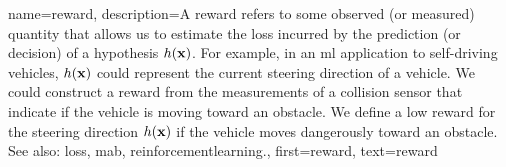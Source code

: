 {name={reward}, 
	description={A reward refers to some observed 
		(or measured) quantity that allows us to estimate the \gls{loss} incurred by the \gls{prediction} 
		(or decision) of a \gls{hypothesis} $h({\bf x})$. For example, in an 
		\gls{ml} application to self-driving vehicles, $h({\bf x})$ could represent 
		the current steering direction of a vehicle. We could construct a reward from the 
		measurements of a collision sensor that indicate if the vehicle is moving toward 
		an obstacle. We define a low reward for the steering direction 
		$h({\bf x})$ if the vehicle moves dangerously toward an obstacle.
			\\
		See also: \gls{loss}, \gls{mab}, \gls{reinforcementlearning}.},
	first={reward}, 
	text={reward}
} 

